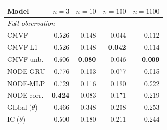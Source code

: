 \begin{tabular}{lrrrr}
\toprule
Model & $n{=}3$ & $n{=}10$ & $n{=}100$ & $n{=}1000$ \\
\midrule
\multicolumn{5}{l}{\emph{Full observation}} \\
CMVF & 0.526 & 0.148 & 0.044 & 0.012 \\
CMVF-L1 & 0.526 & 0.148 & \textbf{0.042} & 0.014 \\
CMVF-unb. & 0.606 & \textbf{0.080} & 0.046 & \textbf{0.009} \\
NODE-GRU & 0.776 & 0.103 & 0.077 & 0.015 \\
NODE-MLP & 0.729 & 0.116 & 0.180 & 0.222 \\
NODE-corr. & \textbf{0.424} & 0.083 & 0.171 & 0.219 \\
Global ($\theta$) & 0.466 & 0.348 & 0.208 & 0.253 \\
IC ($\theta$) & 0.500 & 0.180 & 0.211 & 0.244 \\
\bottomrule
\end{tabular}
